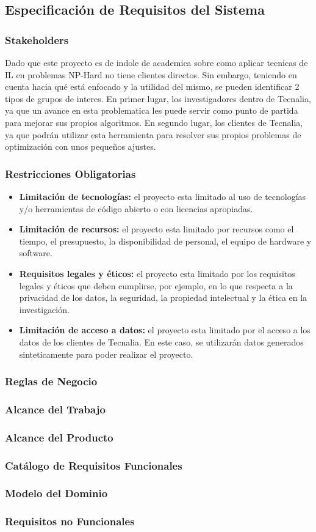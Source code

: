 \subsection{Especificación de Requisitos del Sistema}

\subsubsection{Stakeholders}
Dado que este proyecto es de indole de academica sobre como aplicar 
tecnicas de IL en problemas NP-Hard no tiene clientes directos. Sin embargo, 
teniendo en cuenta hacia qué está enfocado y la utilidad del mismo, se pueden 
identificar 2 tipos de grupos de interes. En primer lugar, los investigadores 
dentro de Tecnalia, ya que un avance en esta problematica les puede servir como punto de partida
para mejorar sus propios algoritmos. En segundo lugar, los clientes de Tecnalia,
ya que podrán utilizar esta herramienta para resolver sus propios problemas de
optimización con unos pequeños ajustes.

\subsubsection{Restricciones Obligatorias}
\begin{itemize}
    \item \textbf{Limitación de tecnologías:} el proyecto esta limitado al uso de
    tecnologías y/o herramientas de código abierto o con licencias apropiadas.
    \item \textbf{Limitación de recursos:} el proyecto esta limitado 
    por recursos como el tiempo, el presupuesto, la disponibilidad de personal, 
    el equipo de hardware y software.
    \item \textbf{Requisitos legales y éticos:} el proyecto esta limitado 
    por los requisitos legales y éticos que deben cumplirse, por ejemplo, en lo 
    que respecta a la privacidad de los datos, la seguridad, la propiedad intelectual 
    y la ética en la investigación.
    \item \textbf{Limitación de acceso a datos:} el proyecto esta limitado
    por el acceso a los datos de los clientes de Tecnalia. En este caso, se
    utilizarán datos generados sinteticamente para poder realizar el proyecto.
\end{itemize}
\subsubsection{Reglas de Negocio}
\subsubsection{Alcance del Trabajo}
\subsubsection{Alcance del Producto}
\subsubsection{Catálogo de Requisitos Funcionales}
\subsubsection{Modelo del Dominio}
\subsubsection{Requisitos no Funcionales}
